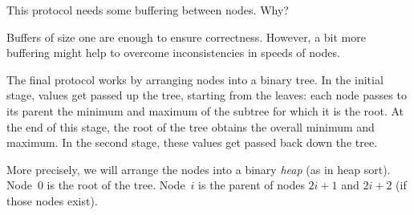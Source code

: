 \documentclass[notes,color]{sepslide0}
\begin{document}

\begin{slide}

This protocol needs some buffering between nodes.  Why?

Buffers of size one are enough to ensure correctness.  However, a bit more
buffering might help to overcome inconsistencies in speeds of nodes.
\end{slide}


\begin{slide}

The final protocol works by arranging nodes into a binary tree.  In the
initial stage, values get passed up the tree, starting from the leaves: each
node passes to its parent the minimum and maximum of the subtree for which it
is the root.  At the end of this stage, the root of the tree obtains the
overall minimum and maximum.  In the second stage, these values get passed
back down the tree.
\end{slide}


\begin{slide}

More precisely, we will arrange the nodes into a binary \emph{heap} (as in
heap sort).  Node~$0$ is the root of the tree.  Node~$i$ is the parent of nodes
$2i+1$ and $2i+2$ (if those nodes exist).
\begin{center}
\end{center}
\end{slide}

\end{document}
